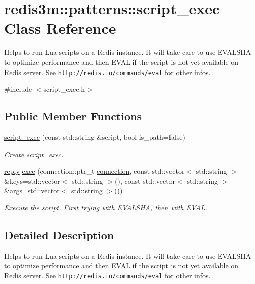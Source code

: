 \hypertarget{classredis3m_1_1patterns_1_1script__exec}{\section{redis3m\-:\-:patterns\-:\-:script\-\_\-exec Class Reference}
\label{classredis3m_1_1patterns_1_1script__exec}
}


Helps to run Lua scripts on a Redis instance. It will take care to use E\-V\-A\-L\-S\-H\-A to optimize performance and then E\-V\-A\-L if the script is not yet available on Redis server. See \href{http://redis.io/commands/eval}{\tt http\-://redis.\-io/commands/eval} for other infos.  




{\ttfamily \#include $<$script\-\_\-exec.\-h$>$}

\subsection*{Public Member Functions}
\begin{DoxyCompactItemize}
\item 
\hyperlink{classredis3m_1_1patterns_1_1script__exec_aae07e70190043893d6bbdd08cfb716fa}{script\-\_\-exec} (const std\-::string \&script, bool is\-\_\-path=false)
\begin{DoxyCompactList}\small\item\em Create \hyperlink{classredis3m_1_1patterns_1_1script__exec}{script\-\_\-exec}. \end{DoxyCompactList}\item 
\hyperlink{classredis3m_1_1reply}{reply} \hyperlink{classredis3m_1_1patterns_1_1script__exec_a79f391b7a3e5a696e0c60318c6ca7b73}{exec} (connection\-::ptr\-\_\-t \hyperlink{classredis3m_1_1connection}{connection}, const std\-::vector$<$ std\-::string $>$ \&keys=std\-::vector$<$ std\-::string $>$(), const std\-::vector$<$ std\-::string $>$ \&args=std\-::vector$<$ std\-::string $>$())
\begin{DoxyCompactList}\small\item\em Execute the script. First trying with E\-V\-A\-L\-S\-H\-A, then with E\-V\-A\-L. \end{DoxyCompactList}\end{DoxyCompactItemize}


\subsection{Detailed Description}
Helps to run Lua scripts on a Redis instance. It will take care to use E\-V\-A\-L\-S\-H\-A to optimize performance and then E\-V\-A\-L if the script is not yet available on Redis server. See \href{http://redis.io/commands/eval}{\tt http\-://redis.\-io/commands/eval} for other infos. 

